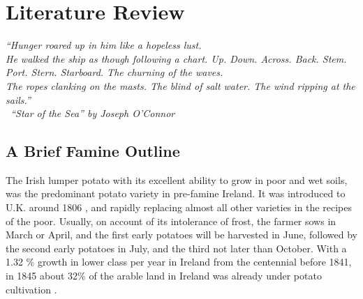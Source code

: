 \chapter{Literature Review}

\textit{``Hunger roared up in him like a hopeless lust.\\ 
He walked the ship as though following a chart. Up. Down. Across. Back. Stem. Port. Stern. Starboard. The churning of the waves. \\
The ropes clanking on the masts. The blind of salt water. The wind ripping at the sails.''\\
\textemdash\ ``Star of the Sea'' by Joseph O'Connor}
\vspace{.2cm}

\section{A Brief Famine Outline}

The Irish lumper potato with its excellent ability to grow in poor and wet soils, was the predominant potato variety in pre-famine Ireland. It was introduced to U.K. around 1806 \citep{tucker2016potato}, and rapidly replacing almost all other varieties in the recipes of the poor. Usually, on account of its intolerance of frost, the farmer sows in March or April, and the first early potatoes will be harvested in June, followed by the second early potatoes in July, and the third not later than October. With a 1.32 \% growth in lower class per year in Ireland from the centennial before 1841, in 1845 about 32\% of the arable land in Ireland was already under potato cultivation \citep{solar2015ireland}.

